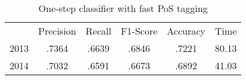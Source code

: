 \begin{table}[t]
    \centering
    \begin{tabular}{l|c|c|c|c|c|}
        \cline{2-6}
        & Precision & Recall & F1-Score & Accuracy & Time \\
        \cline{1-6}
        \multirow{1}{*}{2013} & .7364  & .6639  & .6846  & .7221  & 80.13 \\
        \cline{1-6}
        
        \multirow{1}{*}{2014} & .7032  & .6591  & .6673  & .6892  & 41.03 \\
        \cline{1-6}
    \end{tabular}
    \caption{One-step classifier with fast PoS tagging}
    \label{tab:fast_pos_tagging}   
\end{table}


\glsresetall


